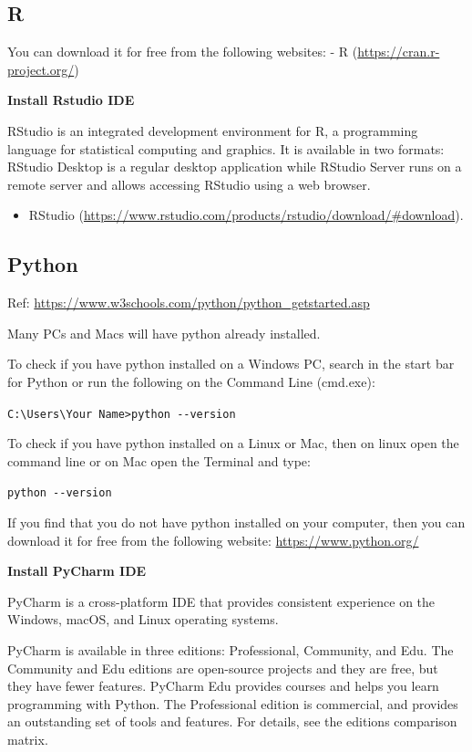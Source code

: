 \documentclass[]{book}
\providecommand{\tightlist}{%
  \setlength{\itemsep}{0pt}\setlength{\parskip}{0pt}}
\begin{document}
\hypertarget{r-3}{%
\subsection{R}\label{r-3}}

You can download it for free from the following websites:
- R (\url{https://cran.r-project.org/})

\textbf{Install Rstudio IDE}

RStudio is an integrated development environment for R, a programming language for statistical computing and graphics. It is available in two formats: RStudio Desktop is a regular desktop application while RStudio Server runs on a remote server and allows accessing RStudio using a web browser.

\begin{itemize}
\tightlist
\item
  RStudio (\url{https://www.rstudio.com/products/rstudio/download/\#download}).
\end{itemize}

\hypertarget{python-3}{%
\subsection{Python}\label{python-3}}

Ref: \url{https://www.w3schools.com/python/python_getstarted.asp}

Many PCs and Macs will have python already installed.

To check if you have python installed on a Windows PC, search in the start bar for Python or run the following on the Command Line (cmd.exe):

\texttt{C:\textbackslash{}Users\textbackslash{}Your\ Name\textgreater{}python\ -\/-version}

To check if you have python installed on a Linux or Mac, then on linux open the command line or on Mac open the Terminal and type:

\texttt{python\ -\/-version}

If you find that you do not have python installed on your computer, then you can download it for free from the following website: \url{https://www.python.org/}

\textbf{Install PyCharm IDE}

PyCharm is a cross-platform IDE that provides consistent experience on the Windows, macOS, and Linux operating systems.

PyCharm is available in three editions: Professional, Community, and Edu. The Community and Edu editions are open-source projects and they are free, but they have fewer features. PyCharm Edu provides courses and helps you learn programming with Python. The Professional edition is commercial, and provides an outstanding set of tools and features. For details, see the editions comparison matrix.
\end{document}
